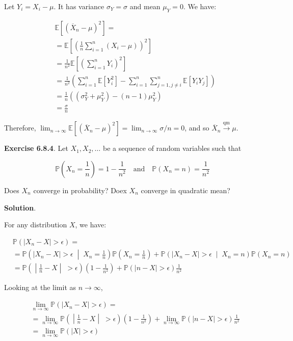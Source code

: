 Let \(Y_i = X_i - \mu\). It has variance \(\sigma_Y = \sigma\) and mean
\(\mu_Y = 0\). We have:

\begin{align}
& \mathbb{E}[(\overline{X}_n - \mu)^2] = \\
& = \mathbb{E}\left[\left(\frac{1}{n} \sum_{i=1}^n (X_i - \mu) \right)^2\right] \\
& = \frac{1}{n^2} \mathbb{E} \left[ \left(\sum_{i=1}^n Y_i \right)^2 \right] \\
& = \frac{1}{n^2} \left( \sum_{i=1}^n \mathbb{E}[Y_i^2] - \sum_{i=1}^n \sum_{j=1, j \neq i}^n \mathbb{E}[Y_i Y_j] \right) \\
& = \frac{1}{n} \left( (\sigma_Y^2 + \mu_Y^2) - (n-1) \mu_Y^2 \right) \\
& = \frac{\sigma}{n}
\end{align}

Therefore,
\(\lim _{n \rightarrow \infty} \mathbb{E}[(\overline{X}_n - \mu)^2] = \lim _{n \rightarrow \infty} \sigma / n = 0\),
and so \(\overline{X}_n \xrightarrow{\text{qm}} \mu\).

\textbf{Exercise 6.8.4}. Let \(X_1, X_2, \dots\) be a sequence of random
variables such that

\[
\begin{equation}
\mathbb{P}\left(X_n = \frac{1}{n}\right) = 1 - \frac{1}{n^2}
\quad\mathrm{and}\quad 
\mathbb{P}\left(X_n = n\right) = \frac{1}{n^2}
\end{equation}
\]

Does \(X_n\) converge in probability? Doex \(X_n\) converge in quadratic
mean?

\textbf{Solution}.

For any distribution \(X\), we have:

\begin{align}
& \mathbb{P}( |X_n - X| > \epsilon ) = \\
&= \mathbb{P}\left( |X_n - X| > \epsilon \;\middle|\; X_n = \frac{1}{n} \right)\mathbb{P}\left(X_n = \frac{1}{n}\right)
  + \mathbb{P}\left( |X_n - X| > \epsilon \;\middle|\; X_n = n \right)\mathbb{P}\left(X_n = n\right) \\
&= \mathbb{P}\left( \middle|\frac{1}{n} - X\middle|\; > \epsilon \right)\left(1 - \frac{1}{n^2} \right)
  + \mathbb{P}\left( |n - X| > \epsilon \right)\frac{1}{n^2}
\end{align}

Looking at the limit as \(n \rightarrow \infty\),

\begin{align}
& \lim _{n \rightarrow \infty} \mathbb{P}( |X_n - X| > \epsilon ) = \\
& = \lim _{n \rightarrow \infty} \mathbb{P}\left( \middle|\frac{1}{n} - X\middle|\; > \epsilon \right)\left(1 - \frac{1}{n^2} \right)
  + \lim _{n \rightarrow \infty} \mathbb{P}\left( |n - X| > \epsilon \right)\frac{1}{n^2} \\
& = \lim _{n \rightarrow \infty} \mathbb{P}\left( |X| > \epsilon \right)
\end{align}

